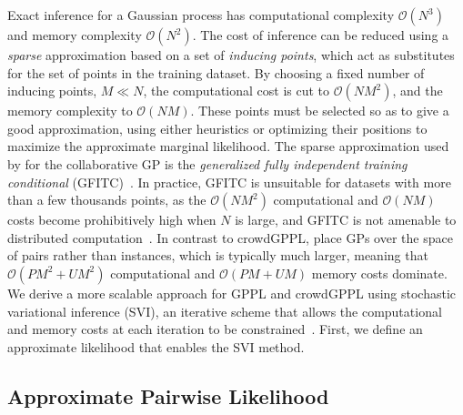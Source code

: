Exact inference for a Gaussian process has computational complexity $\mathcal{O}(N^3)$ 
and memory complexity $\mathcal{O}(N^2)$.
The cost of inference can be reduced using a \emph{sparse} approximation based on a set of 
\emph{inducing points}, which act as substitutes for the set of points in the training dataset.
By choosing a fixed number of inducing points, $M \ll N$, the computational cost is cut to $\mathcal{O}(NM^2)$,
and the memory complexity to $\mathcal{O}(NM)$.
These points must be selected so as to give a good approximation, 
using either heuristics or optimizing their positions to maximize the approximate
marginal likelihood. 
The sparse approximation used by \citet{houlsby2012collaborative} for the collaborative GP 
is the \emph{generalized fully independent training conditional} (GFITC)~\citep{snelson2006sparse}.
In practice, GFITC is unsuitable for datasets with more than a few thousands points,
as the $\mathcal{O}(NM^2)$ computational and $\mathcal{O}(NM)$ costs become prohibitively high
when $N$ is large,
and GFITC is not amenable to distributed computation~\citep{hensman2015scalable}.  
In contrast to crowdGPPL, \citet{houlsby2012collaborative} place GPs over the space of pairs rather than instances,
which is typically much larger, meaning that $\mathcal{O}(PM^2 + UM^2)$ computational and $\mathcal{O}(PM + UM)$
memory costs dominate. 
We derive a more scalable approach for GPPL and crowdGPPL using
stochastic variational inference (SVI), an iterative scheme that allows the computational and memory costs at
each iteration to be constrained~\citep{hoffman2013stochastic}.
First, we define an approximate likelihood that enables the SVI method.

\subsection{Approximate Pairwise Likelihood}

